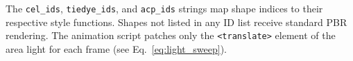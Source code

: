 \documentclass{article}
\begin{document}
The \texttt{cel\_ids}, \texttt{tiedye\_ids}, and \texttt{acp\_ids} strings map shape indices to their respective style functions. Shapes not listed in any ID list receive standard PBR rendering. The animation script patches only the \texttt{<translate>} element of the area light for each frame (see Eq.~\ref{eq:light_sweep}).
\end{document}
